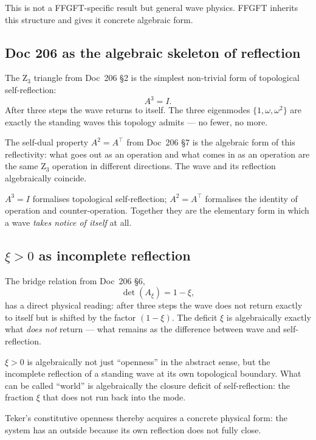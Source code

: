 This is not a FFGFT-specific result but general wave physics. FFGFT inherits this structure and gives it concrete algebraic form.

\subsection{Doc 206 as the algebraic skeleton of reflection}\label{sec:reflection_doc206}

The Z$_3$ triangle from Doc~206 \S2 is the simplest non-trivial form of topological self-reflection:
\begin{equation}
A^3 = I.
\end{equation}
After three steps the wave returns to itself. The three eigenmodes $\{1, \omega, \omega^2\}$ are exactly the standing waves this topology admits --- no fewer, no more.

The self-dual property $A^2 = A^\top$ from Doc~206 \S7 is the algebraic form of this reflectivity: what goes out as an operation and what comes in as an operation are the same Z$_3$ operation in different directions. The wave and its reflection algebraically coincide.

\begin{insightBox}
$A^3 = I$ formalises topological self-reflection; $A^2 = A^\top$ formalises the identity of operation and counter-operation. Together they are the elementary form in which a wave \emph{takes notice of itself} at all.
\end{insightBox}

\subsection{\texorpdfstring{$\xi > 0$ as incomplete reflection}{xi > 0 as incomplete reflection}}\label{sec:reflection_xi}

The bridge relation from Doc~206 \S6,
\begin{equation}
\det(A_\xi) = 1 - \xi,
\end{equation}
has a direct physical reading: after three steps the wave does not return exactly to itself but is shifted by the factor $(1-\xi)$. The deficit $\xi$ is algebraically exactly what \emph{does not} return --- what remains as the difference between wave and self-reflection.

\begin{important}
$\xi > 0$ is algebraically not just ``openness'' in the abstract sense, but the incomplete reflection of a standing wave at its own topological boundary. What can be called ``world'' is algebraically the closure deficit of self-reflection: the fraction $\xi$ that does not run back into the mode.

Teker's constitutive openness thereby acquires a concrete physical form: the system has an outside because its own reflection does not fully close.
\end{important}

